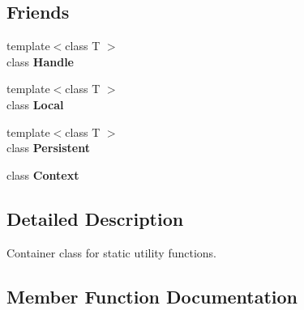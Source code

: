 \subsection*{Friends}
\begin{DoxyCompactItemize}
\item 
\hypertarget{classv8_1_1_v8_a67ca1a2d91273eaf85fb3d23ba8ce984}{}{\footnotesize template$<$class T $>$ }\\class {\bfseries Handle}\label{classv8_1_1_v8_a67ca1a2d91273eaf85fb3d23ba8ce984}

\item 
\hypertarget{classv8_1_1_v8_afb872edb4aac7ba55f0da004113aa2b0}{}{\footnotesize template$<$class T $>$ }\\class {\bfseries Local}\label{classv8_1_1_v8_afb872edb4aac7ba55f0da004113aa2b0}

\item 
\hypertarget{classv8_1_1_v8_afaadbbd2553180545a4e018c3eeac71e}{}{\footnotesize template$<$class T $>$ }\\class {\bfseries Persistent}\label{classv8_1_1_v8_afaadbbd2553180545a4e018c3eeac71e}

\item 
\hypertarget{classv8_1_1_v8_ac26c806e60ca4a0547680edb68f6e39b}{}class {\bfseries Context}\label{classv8_1_1_v8_ac26c806e60ca4a0547680edb68f6e39b}

\end{DoxyCompactItemize}


\subsection{Detailed Description}
Container class for static utility functions. 

\subsection{Member Function Documentation}
\hypertarget{classv8_1_1_v8_a37aadf3536c772eb5bbf67fa7822679a}{}
